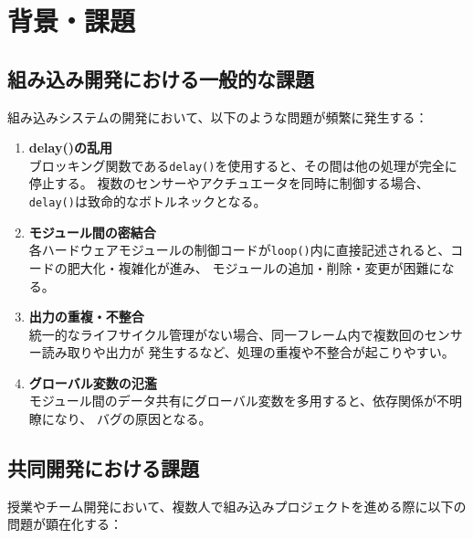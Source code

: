\section{背景・課題}

\subsection{組み込み開発における一般的な課題}

組み込みシステムの開発において、以下のような問題が頻繁に発生する：

\begin{enumerate}
    \item \textbf{delay()の乱用} \\
    ブロッキング関数である\texttt{delay()}を使用すると、その間は他の処理が完全に停止する。
    複数のセンサーやアクチュエータを同時に制御する場合、\texttt{delay()}は致命的なボトルネックとなる。

    \item \textbf{モジュール間の密結合} \\
    各ハードウェアモジュールの制御コードが\texttt{loop()}内に直接記述されると、コードの肥大化・複雑化が進み、
    モジュールの追加・削除・変更が困難になる。

    \item \textbf{出力の重複・不整合} \\
    統一的なライフサイクル管理がない場合、同一フレーム内で複数回のセンサー読み取りや出力が
    発生するなど、処理の重複や不整合が起こりやすい。

    \item \textbf{グローバル変数の氾濫} \\
    モジュール間のデータ共有にグローバル変数を多用すると、依存関係が不明瞭になり、
    バグの原因となる。
\end{enumerate}

\subsection{共同開発における課題}

授業やチーム開発において、複数人で組み込みプロジェクトを進める際に以下の問題が顕在化する：

